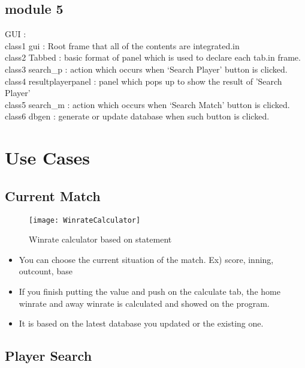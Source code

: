 \documentclass[conference,compsoc, twocolumn]{IEEEtran}
\begin{document}
\subsection{module 5}
GUI : \\
class1 gui : Root frame that all of the contents are integrated.in\\
class2 Tabbed : basic format of panel which is used to declare each tab.in frame.\\
class3 search\_p : action which occurs when ‘Search Player’ button is clicked.\\
class4 resultplayerpanel : panel which pops up to show the result of 'Search Player'\\
class5 search\_m : action which occurs when ‘Search Match’ button is clicked.\\
class6 dbgen : generate or update database when such button is clicked.\\





\section{Use Cases}

\subsection{Current Match}

\begin{figure}[H]
\centering\texttt{[image: WinrateCalculator]}
\caption{Winrate calculator based on statement}
\end{figure}

\begin{itemize}
\item You can choose the current situation of the match. Ex) score, inning, outcount, base
\end{itemize}
\begin{itemize}
\item If you finish putting the value and push on the calculate tab, the home winrate and away winrate is calculated and showed on the program.
\item It is based on the latest database you updated or the existing one.
\end{itemize}


\subsection{Player Search}
\end{document}
